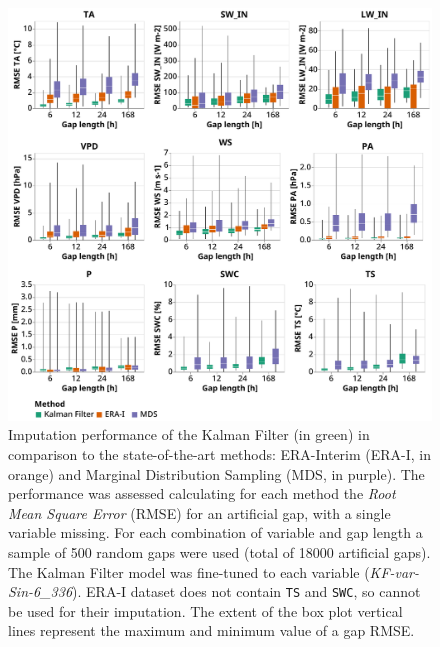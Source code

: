 \documentclass{article}
\newcommand{\imgwidth}{6in}
\begin{document}
\begin{figure}
    \centerline{\includegraphics[width=\imgwidth]{the_plot}}
\caption{ Imputation performance of the Kalman Filter (in green) in comparison to the state-of-the-art methods: ERA-Interim (ERA-I, in orange) and Marginal Distribution Sampling (MDS, in purple). The performance was assessed calculating for each method the \textit{Root Mean Square Error} (RMSE) for an artificial gap, with a single variable missing. For each combination of variable and gap length a sample of 500 random gaps were used (total of 18000 artificial gaps).
The Kalman Filter model was fine-tuned to each variable (\textit{KF-\textlangle var\textrangle-Sin-6\_336}). ERA-I dataset does not contain \texttt{TS} and \texttt{SWC}, so cannot be used for their imputation. The extent of the box plot vertical lines represent the maximum and minimum value of a gap RMSE.}
\label{fig:the_plot}
\end{figure}

\newcommand{\CapTheTable}{Imputation performance of the Kalman filter in comparison to the state-of-the-art
methods: ERA-Interim (ERA-I) and Marginal Distribution Sampling (MDS), using mean and standard deviation of the \textit{Root Mean Square Error} (RMSE). The best method for each gap length is highlighted in bold. For each combination of gap length and variable, 500 artificial gaps were created.}

\end{document}
